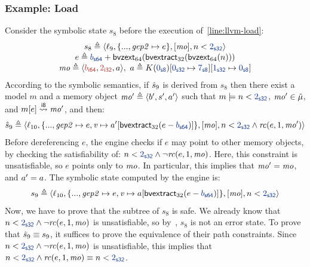 \subsubsection{Example: Load}
Consider the symbolic state $s_8$ before the execution of~\cref{line:llvm-load}:
\[
\begin{array}{c}
s_8 \triangleq \symstate
    {\location_9}
    {\{ ..., \nameid{gep2} \mapsto e \}}
    {[]}
    {[\mo]}
    {n < \bvconst{32}{2}} \\
e \triangleq \bvadd{\bvsort{64}}{\bvconst{64}{\addr}}{\bvzext{64}{\bvextract{32}{\bvzext{64}{n}}}} \\
\mo \triangleq \mobj{\bvval{\addr}{64}}{\bvval{2}{32}}{\arrayvalue}, \ \arrayvalue \triangleq \arraystore{\arraystore{\arrayconst{\arrayinitvalue}}{\bvconst{32}{0}}{\bvconst{8}{7}}}{\bvconst{32}{1}}{\arrayinitvalue}
\end{array}
\]
According to the symbolic semantics,
if $\mech{s}_9$ is derived from $s_8$ then there exist a model $m$ and a memory object $\mo' \triangleq \mobj{\addr'}{\size'}{\arrayvalue'}$ such that
$m \models n < \bvconst{32}{2}$, $\mo' \in \symmemory$, and $\symisinbounds{e}{\bvsort{8}}{\mo'}{m}$, and then:
\[
\mech{s}_9 \triangleq \symstate
    {\location_{10}}
    {\{ ..., \nameid{gep2} \mapsto e, \nameid{v} \mapsto \arrayselect{\arrayvalue'}{\bvextract{32}{\bvsub{\bvsort{64}}{e}{\bvconst{64}{\addr}}}} \}}
    {[]}
    {[\mo]}
    {n < \bvconst{32}{2} \land \rangecond(e, 1, \mo')}
\]
Before dereferencing $e$, the \SE engine checks if $e$ may point to other memory objects,
by checking the satisfiability of: $n < \bvconst{32}{2} \land \neg \rangecond(e, 1, \mo)$.
Here, this constraint is unsatisfiable, so $e$ points only to $\mo$.
In particular, this implies that $\mo' = \mo$, and $\arrayvalue' = \arrayvalue$.
The symbolic state computed by the \SE engine is:
\[
s_9 \triangleq \symstate
    {\location_{10}}
    {\{ ..., \nameid{gep2} \mapsto e, \nameid{v} \mapsto \arrayselect{\arrayvalue}{\bvextract{32}{\bvsub{\bvsort{64}}{e}{\bvconst{64}{\addr}}}} \}}
    {[]}
    {[\mo]}
    {n < \bvconst{32}{2}}
\]
Now, we have to prove that the subtree of $s_8$ is safe.
We already know that $n < \bvconst{32}{2} \land \neg \rangecond(e, 1, \mo)$ is unsatisfiable,
so by~, $s_8$ is not an error state.
To prove that $\mech{s}_9 \equiv s_9$, it suffices to prove the equivalence of their path constraints.
Since $n < \bvconst{32}{2} \land \neg \rangecond(e, 1, \mo)$ is unsatisfiable,
this implies that $n < \bvconst{32}{2} \land \rangecond(e, 1, \mo) \equiv n < \bvconst{32}{2}$.

